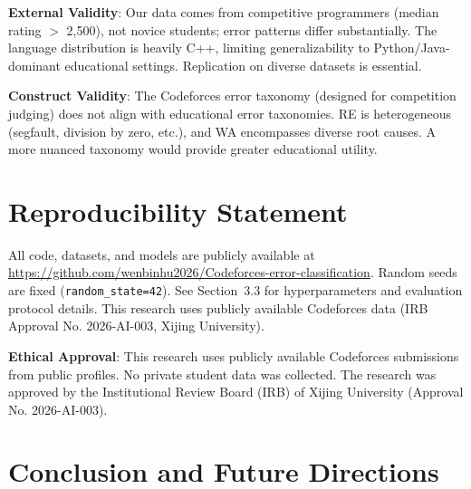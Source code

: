 \documentclass[10pt,a4paper]{article}
\begin{document}
\textbf{External Validity}: Our data comes from competitive programmers (median rating $>$ 2,500), not novice students; error patterns differ substantially. The language distribution is heavily C++, limiting generalizability to Python/Java-dominant educational settings. Replication on diverse datasets is essential.

\textbf{Construct Validity}: The Codeforces error taxonomy (designed for competition judging) does not align with educational error taxonomies. RE is heterogeneous (segfault, division by zero, etc.), and WA encompasses diverse root causes. A more nuanced taxonomy would provide greater educational utility.

\section*{Reproducibility Statement}

\begin{sloppypar}\raggedright
All code, datasets, and models are publicly available at \url{https://github.com/wenbinhu2026/Codeforces-error-classification}. Random seeds are fixed (\texttt{random\_state=42}). See Section~3.3 for hyperparameters and evaluation protocol details. This research uses publicly available Codeforces data (IRB Approval No. 2026-AI-003, Xijing University).
\end{sloppypar}


\textbf{Ethical Approval}: This research uses publicly available Codeforces
submissions from public profiles. No private student data was collected.
The research was approved by the Institutional Review Board (IRB) of
Xijing University (Approval No. 2026-AI-003).

\section{Conclusion and Future Directions}
\end{document}
